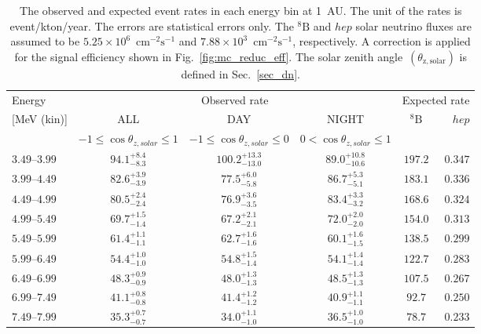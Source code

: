 \documentclass[aps,prd,reprint,superscriptaddress,floatfix,altaffilletter,nofootinbib]{revtex4-2}
\begin{document}
\begin{table}[h]
\caption{
The observed and expected event rates in each
 energy bin at 1~AU. 
 The unit of the rates is event/kton/year.
 The errors are statistical errors only. The
 $\mathrm{^{8}B}$ and $hep$ solar neutrino fluxes are assumed to be
 $5.25\times10^{6}$~$\mathrm{cm^{-2}s^{-1}}$ and $7.88\times10^{3}$~$\mathrm{cm^{-2}s^{-1}}$, respectively. 
 A correction is applied for the signal efficiency shown in Fig.~\ref{fig:mc_reduc_eff}. The solar zenith angle~$(\theta_{\mathrm{z,solar}})$ is defined in Sec.~\ref{sec_dn}.}  
\label{tab:obs-rate}
\begin{center}
\begin{tabular}{l@{\quad}ccc@{\quad}cr} \hline \hline
Energy & \multicolumn{3}{c}{Observed rate} & \multicolumn{2}{c}{Expected rate} \\
{}[MeV (kin)]& ALL & DAY & NIGHT & $\mathrm{^{8}B}$ & $hep$ \\
& $ -1 \leq \cos\theta_{z,solar} \leq 1 $   & $ -1 \leq \cos\theta_{z,solar} \leq 0 $  & $  0 < \cos\theta_{z,solar} \leq 1 $  & &\\
\hline
$3.49$--$3.99$ & $  94.1^{ +8.4}_{ -8.3}$ & $ 100.2^{+13.3}_{-13.0}$ & $  89.0^{+10.8}_{-10.6}$ & $  197.2$ & $  0.347$ \\
$3.99$--$4.49$ & $  82.6^{ +3.9}_{ -3.9}$ & $  77.5^{ +6.0}_{ -5.8}$ & $  86.7^{ +5.3}_{ -5.1}$ & $  183.1$ & $  0.336$ \\
$4.49$--$4.99$ & $  80.5^{ +2.4}_{ -2.4}$ & $  76.9^{ +3.6}_{ -3.5}$ & $  83.4^{ +3.3}_{ -3.2}$ & $  168.6$ & $  0.324$ \\
$4.99$--$5.49$ & $  69.7^{ +1.5}_{ -1.4}$ & $  67.2^{ +2.1}_{ -2.1}$ & $  72.0^{ +2.0}_{ -2.0}$ & $  154.0$ & $  0.313$ \\
$5.49$--$5.99$ & $  61.4^{ +1.1}_{ -1.1}$ & $  62.7^{ +1.6}_{ -1.6}$ & $  60.1^{ +1.6}_{ -1.5}$ & $  138.5$ & $  0.299$ \\
$5.99$--$6.49$ & $  54.4^{ +1.0}_{ -1.0}$ & $  54.8^{ +1.5}_{ -1.4}$ & $  54.1^{ +1.4}_{ -1.4}$ & $  122.7$ & $  0.283$ \\
$6.49$--$6.99$ & $  48.3^{ +0.9}_{ -0.9}$ & $  48.0^{ +1.3}_{ -1.3}$ & $  48.5^{ +1.3}_{ -1.3}$ & $  107.5$ & $  0.267$ \\
$6.99$--$7.49$ & $  41.1^{ +0.8}_{ -0.8}$ & $  41.4^{ +1.2}_{ -1.2}$ & $  40.9^{ +1.1}_{ -1.1}$ & $   92.7$ & $  0.250$ \\
$7.49$--$7.99$ & $  35.3^{ +0.7}_{ -0.7}$ & $  34.0^{ +1.1}_{ -1.0}$ & $  36.5^{ +1.0}_{ -1.0}$ & $   78.7$ & $  0.233$ \\

\end{tabular}
\end{center}
\end{table}
\end{document}
